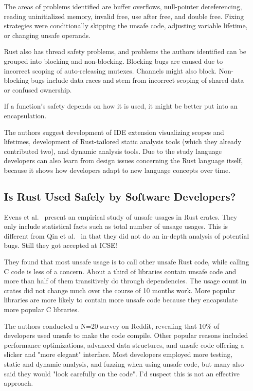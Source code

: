 The areas of problems identified are buffer overflows, null-pointer dereferencing, reading uninitialized memory, invalid
free, use after free, and double free.
Fixing strategies were conditionally skipping the unsafe code, adjusting variable lifetime, or changing unsafe operands.

Rust also has thread safety problems, and problems the authors identified can be grouped into blocking and non-blocking.
Blocking bugs are caused due to incorrect scoping of auto-releasing mutexes.
Channels might also block.
Non-blocking bugs include data races and stem from incorrect scoping of shared data or confused ownership.

If a function's safety depends on how it is used, it might be better put into an encapsulation.

The authors suggest development of IDE extension visualizing scopes and lifetimes, development of Rust-tailored static
analysis tools (which they already contributed two), and dynamic analysis tools.
Due to the study language developers can also learn from design issues concerning the Rust language itself, because it
shows how developers adapt to new language concepts over time.



\subsection{Is Rust Used Safely by Software Developers?}
\label{subsec:is-rust-used-safely-by-software-developers?}

Evens et al.~\cite{evans2020} present an empirical study of unsafe usages in Rust crates.
They only include statistical facts such as total number of unsage usages.
This is different from Qin et al.~\cite{qin2020} in that they did not do an in-depth analysis of potential bugs.
Still they got accepted at ICSE!

They found that most unsafe usage is to call other unsafe Rust code, while calling C code is less of a concern.
About a third of libraries contain unsafe code and more than half of them transitively do through dependencies.
The usage count in crates did not change much over the course of 10 months work.
More popular libraries are more likely to contain more unsafe code because they encapsulate more popular C libraries.

The authors conducted a N=20 survey on Reddit, revealing that 10\% of developers used unsafe to make the code compile.
Other popular reasons included performance optimizations, advanced data structures, and unsafe code offering a slicker
and "more elegant" interface.
Most developers employed more testing, static and dynamic analysis, and fuzzing when using unsafe code, but many also
said they would "look carefully on the code".
I'd suspect this is not an effective approach.

